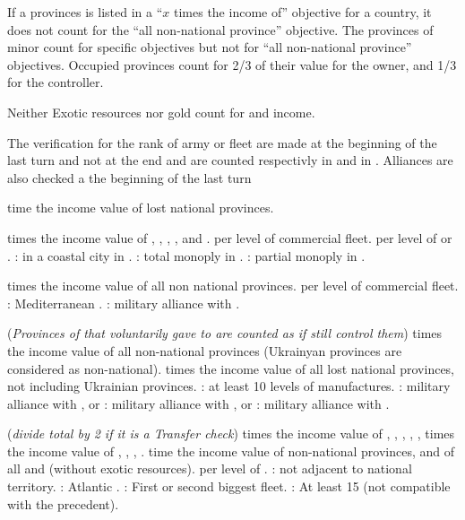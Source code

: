 \aparag If a provinces is listed in a ``$x$ times the income of'' objective
for a country, it does not count for the ``all non-national province''
objective.
\bparag The provinces of \VASSAL minor count for specific objectives but not
for ``all non-national province'' objectives.
\bparag Occupied provinces count for 2/3 of their value for the owner, and 1/3
for the controller.

\aparag Neither Exotic resources nor gold count for \COL and \TP income.

\aparag The verification for the rank of army or fleet are made at the
beginning of the last turn and not at the end and are counted respectivly in
\LD and in \NWD.
\aparag Alliances are also checked a the beginning of the last turn

 time the income value of lost national provinces.

 times the income value of ,
, , ,
and .
 \VP per level of commercial fleet.
 \VP per level of \COL or \TP.
 \VPs: \COL in a coastal city in .%
 \VPs: total monoply in .
 \VPs: partial monoply in .

 times the income value of all non national provinces.
 \VP per level of commercial fleet.
 \VPs: Mediterranean .
 \VPs: military alliance with .

\bparag ({\it Provinces of  that 
  voluntarily gave to  are counted as if
   still control them})
 times the income value of all non-national provinces (Ukrainyan
provinces are considered as non-national).
 times the income value of all lost national provinces, not
including Ukrainian provinces.
 \VPs: at least 10 levels of manufactures.
 \VPs: military alliance with , or
 \VPs: military alliance with , or
 \VPs: military alliance with .

\bparag ({\it divide total by 2 if it is a Transfer check})
 times the income value of ,
, , ,
, 
 times the income value of ,
, , .
 time the income value of non-national provinces, and of all \COL and
\TP (without exotic resources).
 \VP per level of .
 \VPs: \FRA not adjacent to national territory.
 \VPs: Atlantic .
 \VPs: First or second biggest fleet.
 \VPs: At least 15 \NWD (not compatible with the precedent).

